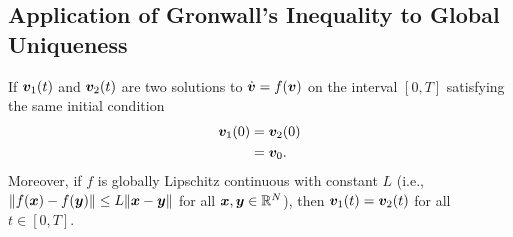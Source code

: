 \subsection{Application of Gronwall's Inequality to Global Uniqueness}

\begin{theorem}
If $\bm{v}_1(t)$ and $\bm{v}_2(t)$ are two solutions to $\dot{\bm{v}} = f(\bm{v})$ on the interval $[0, T]$ satisfying the same initial condition
\[
\begin{aligned}
\bm{v}_1(0) &= \bm{v}_2(0) \\
&= \bm{v}_0.
\end{aligned}
\]
Moreover, if $f$ is globally Lipschitz continuous with constant $L$ (i.e., $\|f(\bm{x}) - f(\bm{y})\| \leq L\|\bm{x} - \bm{y}\|$ for all $\bm{x}, \bm{y} \in \mathbb{R}^N$), then $\bm{v}_1(t) = \bm{v}_2(t)$ for all $t \in [0, T]$.
\end{theorem}

